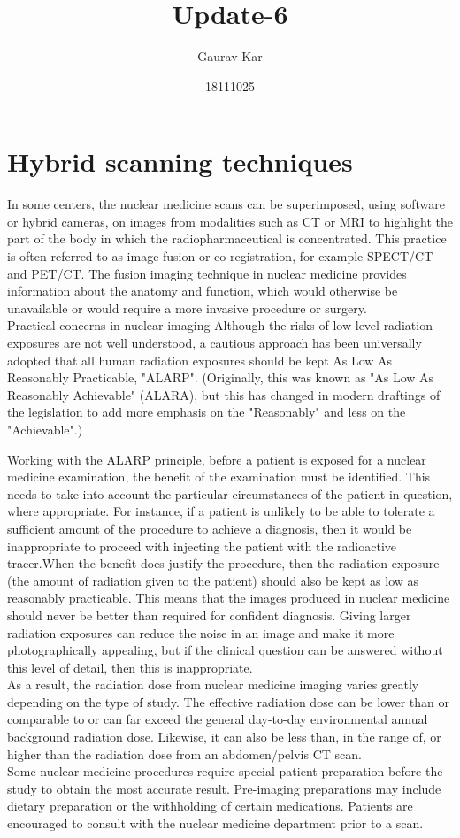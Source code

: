 \documentclass{article}
\title{Update-6}
\author{Gaurav Kar}
\date{18111025}
\begin{document}
\maketitle

\section{Hybrid scanning techniques}
In some centers, the nuclear medicine scans can be superimposed, using software or hybrid cameras, on images from modalities such as CT or MRI to highlight the part of the body in which the radiopharmaceutical is concentrated. This practice is often referred to as image fusion or co-registration, for example SPECT/CT and PET/CT. The fusion imaging technique in nuclear medicine provides information about the anatomy and function, which would otherwise be unavailable or would require a more invasive procedure or surgery.\\Practical concerns in nuclear imaging
Although the risks of low-level radiation exposures are not well understood, a cautious approach has been universally adopted that all human radiation exposures should be kept As Low As Reasonably Practicable, "ALARP". (Originally, this was known as "As Low As Reasonably Achievable" (ALARA), but this has changed in modern draftings of the legislation to add more emphasis on the "Reasonably" and less on the "Achievable".)

Working with the ALARP principle, before a patient is exposed for a nuclear medicine examination, the benefit of the examination must be identified. This needs to take into account the particular circumstances of the patient in question, where appropriate. For instance, if a patient is unlikely to be able to tolerate a sufficient amount of the procedure to achieve a diagnosis, then it would be inappropriate to proceed with injecting the patient with the radioactive tracer.When the benefit does justify the procedure, then the radiation exposure (the amount of radiation given to the patient) should also be kept as low as reasonably practicable. This means that the images produced in nuclear medicine should never be better than required for confident diagnosis. Giving larger radiation exposures can reduce the noise in an image and make it more photographically appealing, but if the clinical question can be answered without this level of detail, then this is inappropriate.\\As a result, the radiation dose from nuclear medicine imaging varies greatly depending on the type of study. The effective radiation dose can be lower than or comparable to or can far exceed the general day-to-day environmental annual background radiation dose. Likewise, it can also be less than, in the range of, or higher than the radiation dose from an abdomen/pelvis CT scan.\\Some nuclear medicine procedures require special patient preparation before the study to obtain the most accurate result. Pre-imaging preparations may include dietary preparation or the withholding of certain medications. Patients are encouraged to consult with the nuclear medicine department prior to a scan.
\end{document}
